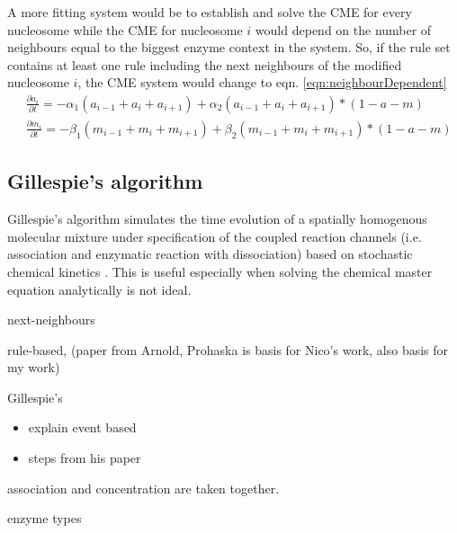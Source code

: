             A more fitting system would be to establish and solve the CME for every nucleosome while the CME for nucleosome $i$ would depend on the number of neighbours equal to the biggest enzyme context in the system. So, if the rule set contains at least one rule including the next neighbours of the modified nucleosome $i$, the CME system would change to eqn. \ref{eqn:neighbourDependent}
            \begin{subequations}
                \begin{align}
                    &\frac{\partial a_i}{\partial t} = - \alpha_1 (a_{i-1} + a_i + a_{i+1}) + \alpha_2 (a_{i-1} + a_i + a_{i+1})*(1-a-m)\\
                    &\frac{\partial m_i}{\partial t} = - \beta_1 (m_{i-1} + m_i + m_{i+1}) + \beta_2 (m_{i-1} + m_i + m_{i+1})*(1-a-m)
                \end{align}
                \label{eqn:neighbourDependent}
            \end{subequations}
        \subsection{Gillespie's algorithm}
            Gillespie's algorithm simulates the time evolution of a spatially homogenous molecular mixture under specification of the coupled reaction channels (i.e. association and enzymatic reaction with dissociation) based on stochastic chemical kinetics \cite{gillespie1976general, gillespie1992rigorous}. This is useful especially when solving the chemical master equation analytically is not ideal.\\
            \begin{itemize}
                {
                    \color{red}
                    \item next-neighbours
                    \item rule-based, (paper from Arnold, Prohaska is basis for Nico's work, also basis for my work)
                    \item Gillespie's
                        \begin{itemize}
                            \item explain event based
                            \item steps from his paper
                        \end{itemize}
                    \item association and concentration are taken together.
                    \item enzyme types

                }
            \end{itemize}
